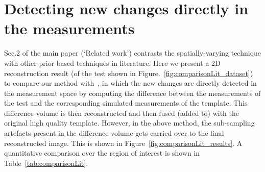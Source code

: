\documentclass{article}
\begin{document}
\section{Detecting new changes directly in the measurements}
Sec.2 of the main paper (`Related work') contrasts the spatially-varying technique  with other prior based techniques in literature. Here we present a 2D reconstruction  result (of the test shown in Figure.~\ref{fig:comparisonLit_dataset}) to compare our method with~\cite{Lee2012}, in which the new changes are directly detected in the measurement space by computing the difference between the measurements of the test and the corresponding simulated measurements of the template. This difference-volume is then reconstructed and then fused (added to) with the original high quality template. However, in the above method, the sub-sampling artefacts present in the difference-volume gets carried over to the final reconstructed image. This is shown in Figure~\ref{fig:comparisonLit_results}. A quantitative comparison over the region of interest is shown in Table~\ref{tab:comparisonLit}.
\end{document}

